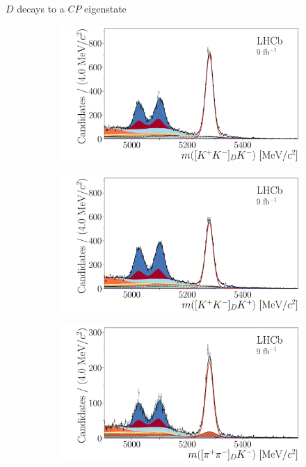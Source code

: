 \documentclass{beamer}
\begin{document}
\begin{frame}{$D$ decays to a $C\!P$ eigenstate}
  \begin{figure}
    \centering
    \begin{subfigure}{0.45\textwidth}
      \includegraphics[width = 1.0\textwidth]{Plots/B2DK_D2KK_Minus.pdf}
    \end{subfigure}%
    \begin{subfigure}{0.45\textwidth}
      \includegraphics[width = 1.0\textwidth]{Plots/B2DK_D2KK_Plus.pdf}
    \end{subfigure}
    \begin{subfigure}{0.45\textwidth}
      \includegraphics[width = 1.0\textwidth]{Plots/B2DK_D2pipi_Minus.pdf}

\end{subfigure}
\end{figure}
\end{frame}
\end{document}
